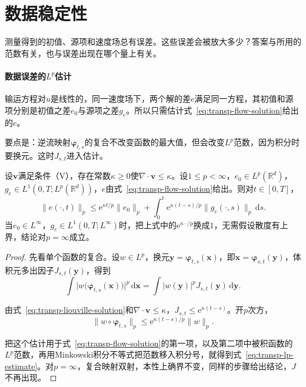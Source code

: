 \section{数据稳定性}
\label{sec:transp-stability}

测量得到的初值、源项和速度场总有误差。这些误差会被放大多少？答案与所用的范数有关，也与误差出现在哪个量上有关。

\paragraph{数据误差的$L^p$估计}
输运方程对$u$是线性的，同一速度场下，两个解的差$e$满足同一方程，其初值和源项分别是初值之差$e_0$与源项之差$g_e$。所以只需估计式~\eqref{eq:transp-flow-solution}给出的$e$。

要点是：逆流映射$\bm{\varphi}_{t,s}$的复合不改变函数的最大值，但会改变$L^{p}$范数，因为积分时要换元。这时$J_{s,t}$进入估计。

\begin{theorem}[数据误差的$L^{p}$估计]
\label{thm:transp-lp}
设$\bm{v}$满足条件（V），存在常数$\kappa\geq0$使$\nabla\cdot\bm{v}\leq\kappa$。设$1\leq p<\infty$，$e_0\in L^{p}(\mathbb{R}^{d})$，$g_e\in L^{1}(0,T;L^{p}(\mathbb{R}^{d}))$，$e$由式~\eqref{eq:transp-flow-solution}给出。则对$t\in[0,T]$，
\begin{equation}
  \lVert e(\cdot,t)\rVert_{p}\leq\mathrm{e}^{\kappa t/p}\lVert e_0\rVert_{p}
  +\int_0^{t}\mathrm{e}^{\kappa(t-s)/p}\lVert g_e(\cdot,s)\rVert_{p}\,\mathrm{d}s.
  \label{eq:transp-lp-estimate}
\end{equation}
当$e_0\in L^{\infty}$，$g_e\in L^{1}(0,T;L^{\infty})$时，把上式中的$\mathrm{e}^{\kappa\cdot/p}$换成$1$，无需假设散度有上界，结论对$p=\infty$成立。
\end{theorem}

\begin{proof}
先看单个函数的复合。设$w\in L^{p}$，换元$\bm{y}=\bm{\varphi}_{t,s}(\bm{x})$，即$\bm{x}=\bm{\varphi}_{s,t}(\bm{y})$，体积元多出因子$J_{s,t}(\bm{y})$，得到
\[
  \int\bigl\lvert w\bigl(\bm{\varphi}_{t,s}(\bm{x})\bigr)\bigr\rvert^{p}\,\mathrm{d}\bm{x}
  =\int\lvert w(\bm{y})\rvert^{p}J_{s,t}(\bm{y})\,\mathrm{d}\bm{y}.
\]

由式~\eqref{eq:transp-liouville-solution}和$\nabla\cdot\bm{v}\leq\kappa$，$J_{s,t}\leq\mathrm{e}^{\kappa(t-s)}$。开$p$次方，
\[
  \lVert w\circ\bm{\varphi}_{t,s}\rVert_{p}\leq\mathrm{e}^{\kappa(t-s)/p}\lVert w\rVert_{p}.
\]

把这个估计用于式~\eqref{eq:transp-flow-solution}的第一项，以及第二项中被积函数的$L^p$范数，再用Minkowski积分不等式把范数移入积分号，就得到式~\eqref{eq:transp-lp-estimate}。对$p=\infty$，复合映射双射，本性上确界不变，同样的步骤给出结论，$J$不再出现。
\end{proof}

